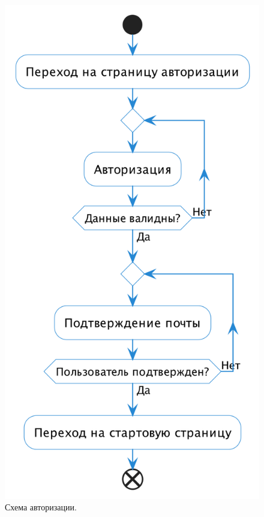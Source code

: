 \documentclass[a4paper,14pt]{extarticle}
\begin{document}
\begin{figure}[H]
    \centering
    \includegraphics[height=0.65\textheight]{images/auth.png}
    \caption{Схема авторизации.}
\end{figure}
\end{document}
